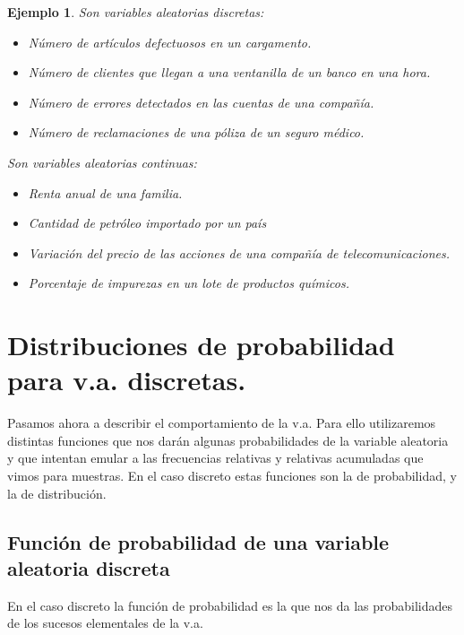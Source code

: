 \documentclass[12pt]{report}
\newtheorem{example}[definition]{Ejemplo}
\begin{document}
  \begin{example}
      Son variables aleatorias discretas:
      \begin{itemize}
          \item  Número de artículos defectuosos en un cargamento.
          \item  Número de clientes que llegan a una ventanilla de un
          banco en una hora.
          \item  Número de errores detectados en las cuentas de una
          compañía.
          \item  Número de reclamaciones de una póliza de un seguro
          médico.
      \end{itemize}

       Son variables aleatorias continuas:
      \begin{itemize}
          \item  Renta anual de una familia.
          \item Cantidad de petróleo importado por un país
          \item  Variación del precio de las acciones de una compañía
          de telecomunicaciones.
          \item  Porcentaje de impurezas en un lote de productos
          químicos.
      \end{itemize}
\end{example}



\section{Distribuciones de probabilidad para v.a. discretas.}

Pasamos ahora a describir el comportamiento  de la v.a. Para ello utilizaremos distintas
funciones que nos darán algunas probabilidades de la variable aleatoria y que intentan
emular a las frecuencias relativas y relativas acumuladas que vimos para muestras. En el
caso discreto estas funciones son la de probabilidad, y  la de distribución.

\subsection{Función de probabilidad de una variable aleatoria
discreta}

En el caso discreto la función de probabilidad es la que nos da las probabilidades de los
sucesos elementales de la v.a.
\end{document}
